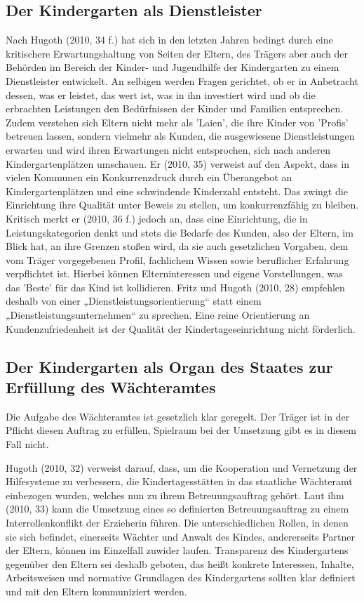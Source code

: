 \subsection{Der Kindergarten als Dienstleister}
Nach Hugoth (2010, 34 f.) hat sich in den letzten Jahren bedingt durch eine kritischere Erwartungshaltung von Seiten der Eltern, des Trägers aber auch der Behörden im Bereich der Kinder- und Jugendhilfe der Kindergarten zu einem Dienstleister entwickelt. An selbigen werden  Fragen gerichtet, ob er in Anbetracht dessen, was er leistet, das wert ist, was in ihn investiert wird und ob die erbrachten Leistungen den Bedürfnissen der Kinder und Familien entsprechen. Zudem verstehen sich Eltern nicht mehr als 'Laien', die ihre Kinder von 'Profis' betreuen lassen, sondern vielmehr als Kunden, die ausgewiesene Dienstleistungen erwarten und wird ihren Erwartungen nicht entsprochen, sich nach anderen Kindergartenplätzen umschauen. Er (2010, 35) verweist auf den Aspekt, dass in vielen Kommunen ein Konkurrenzdruck durch ein Überangebot an Kindergartenplätzen und eine schwindende Kinderzahl entsteht. Das zwingt die Einrichtung ihre Qualität unter Beweis zu stellen, um konkurrenzfähig zu bleiben. 
Kritisch merkt er (2010, 36 f.) jedoch an, dass eine Einrichtung, die in Leistungskategorien denkt und stets die Bedarfe des Kunden, also der Eltern, im Blick hat, an ihre Grenzen stoßen wird, da sie auch gesetzlichen Vorgaben, dem vom Träger vorgegebenen Profil, fachlichem Wissen sowie beruflicher Erfahrung verpflichtet ist. Hierbei können Elterninteressen und eigene Vorstellungen, was das 'Beste' für das Kind ist kollidieren. Fritz und Hugoth (2010, 28) empfehlen deshalb von einer „Dienstleistungsorientierung“ statt einem „Dienstleistungsunternehmen“ zu sprechen. Eine reine Orientierung an Kundenzufriedenheit ist der Qualität der Kindertageseinrichtung nicht förderlich. 

\subsection{Der Kindergarten als Organ des Staates zur Erfüllung des Wächteramtes}
Die Aufgabe des Wächteramtes ist gesetzlich klar geregelt. Der Träger ist in der Pflicht diesen Auftrag zu erfüllen, Spielraum bei der Umsetzung gibt es in diesem Fall nicht.
 
Hugoth (2010, 32) verweist darauf, dass, um die Kooperation und Vernetzung der Hilfesysteme zu verbessern, die Kindertagesstätten in das staatliche Wächteramt einbezogen wurden, welches nun zu ihrem Betreuungsauftrag gehört. Laut ihm (2010, 33) kann die Umsetzung eines so definierten Betreuungsauftrag zu einem Interrollenkonflikt der Erzieherin führen. Die unterschiedlichen Rollen, in denen sie sich befindet, einerseits Wächter und Anwalt des Kindes, andererseits Partner der Eltern, können im Einzelfall zuwider laufen. Transparenz des Kindergartens gegenüber den Eltern sei deshalb geboten, das heißt konkrete Interessen, Inhalte, Arbeitsweisen und normative Grundlagen des Kindergartens sollten klar definiert und mit den Eltern kommuniziert werden.

